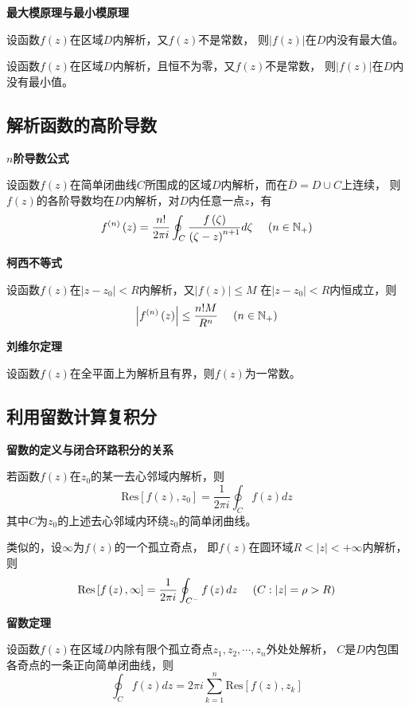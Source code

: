 \documentclass[a4paper,12pt]{article}
\begin{document}
\noindent
\textbf{最大模原理与最小模原理}

设函数$f\left(z\right)$在区域$D$内解析，又$f\left(z\right)$不是常数，
则$\left|f\left(z\right)\right|$在$D$内没有最大值。

设函数$f\left(z\right)$在区域$D$内解析，且恒不为零，又$f\left(z\right)$不是常数，
则$\left|f\left(z\right)\right|$在$D$内没有最小值。

\subsection{解析函数的高阶导数}

\noindent
\textbf{$n$阶导数公式}

设函数$f\left(z\right)$在简单闭曲线$C$所围成的区域$D$内解析，而在$\overline{D}=D\cup C$上连续，
则$f\left(z\right)$的各阶导数均在$D$内解析，对$D$内任意一点$z$，有
$$
f^{\left(n\right)}\left(z\right)=\frac{n!}{2\pi i}\oint_C
\frac{f\left(\zeta\right)}{\left(\zeta-z\right)^{n+1}}d\zeta
\kern 12pt \left(n\in\mathbb{N}_+\right)
$$

\noindent
\textbf{柯西不等式}

设函数$f\left(z\right)$在$\left|z-z_0\right|<R$内解析，又$\left|f\left(z\right)\right|\le M$
在$\left|z-z_0\right|<R$内恒成立，则
$$
\left|f^{\left(n\right)}\left(z\right)\right|\le \frac{n!M}{R^n}\kern 12pt \left(n\in\mathbb{N}_+\right)
$$

\noindent
\textbf{刘维尔定理}

设函数$f\left(z\right)$在全平面上为解析且有界，则$f\left(z\right)$为一常数。

\subsection{利用留数计算复积分}

\noindent
\textbf{留数的定义与闭合环路积分的关系}

若函数$f\left(z\right)$在$z_0$的某一去心邻域内解析，则
$$
\text{Res}\left[f\left(z\right),z_0\right]=\frac1{2\pi i}\oint_Cf\left(z\right)dz
$$
其中$C$为$z_0$的上述去心邻域内环绕$z_0$的简单闭曲线。

类似的，设$\infty$为$f\left(z\right)$的一个孤立奇点，
即$f\left(z\right)$在圆环域$R<\left|z\right|<+\infty$内解析，则
$$
\text{Res}\left[f\left(z\right),\infty\right]=\frac1{2\pi i}\oint_{C^-}f\left(z\right)dz
\kern 12pt \left(C:\left|z\right|=\rho>R\right)
$$

\noindent
\textbf{留数定理}

设函数$f\left(z\right)$在区域$D$内除有限个孤立奇点$z_1,z_2,\cdots,z_n$外处处解析，
$C$是$D$内包围各奇点的一条正向简单闭曲线，则
$$
\oint_Cf\left(z\right)dz=2\pi i\sum_{k=1}^n\text{Res}\left[f\left(z\right),z_k\right]
$$
\end{document}
